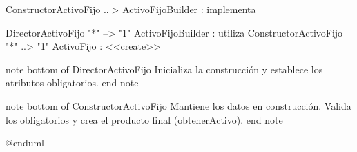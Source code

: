 ConstructorActivoFijo ..|> ActivoFijoBuilder : implementa

DirectorActivoFijo "*" --> "1" ActivoFijoBuilder : utiliza
ConstructorActivoFijo "*" ..> "1" ActivoFijo : <<create>>

note bottom of DirectorActivoFijo
  Inicializa la construcción y
  establece los atributos obligatorios.
end note

note bottom of ConstructorActivoFijo
  Mantiene los datos en construcción.
  Valida los obligatorios y crea
  el producto final (obtenerActivo).
end note

@enduml

